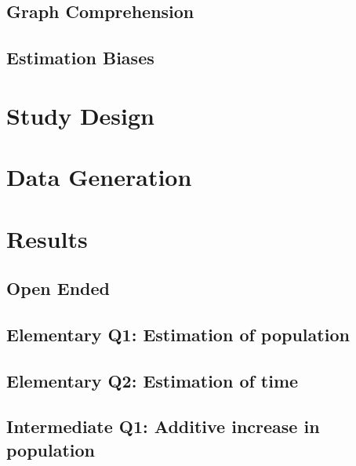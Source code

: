 \documentclass[print]{nuthesis}
\begin{document}
\hypertarget{graph-comprehension-1}{%
\subsection{Graph Comprehension}\label{graph-comprehension-1}}

\hypertarget{estimation-biases-1}{%
\subsection{Estimation Biases}\label{estimation-biases-1}}

\hypertarget{study-design-2}{%
\section{Study Design}\label{study-design-2}}

\hypertarget{data-generation-3}{%
\section{Data Generation}\label{data-generation-3}}

\hypertarget{results-3}{%
\section{Results}\label{results-3}}

\hypertarget{open-ended}{%
\subsection{Open Ended}\label{open-ended}}

\hypertarget{elementary-q1-estimation-of-population}{%
\subsection{Elementary Q1: Estimation of population}\label{elementary-q1-estimation-of-population}}

\hypertarget{elementary-q2-estimation-of-time}{%
\subsection{Elementary Q2: Estimation of time}\label{elementary-q2-estimation-of-time}}

\hypertarget{intermediate-q1-additive-increase-in-population}{%
\subsection{Intermediate Q1: Additive increase in population}\label{intermediate-q1-additive-increase-in-population}}
\end{document}
